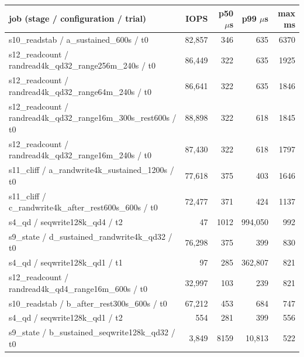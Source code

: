 \begin{tabular}{lrrrr}
\toprule
job (stage / configuration / trial) & IOPS & p50 $\mu$s & p99 $\mu$s & max ms \\
\midrule
s10\_readstab / a\_sustained\_600s / t0 & 82,857 & 346 & 635 & 6370 \\
s12\_readcount / randread4k\_qd32\_range256m\_240s / t0 & 86,449 & 322 & 635 & 1925 \\
s12\_readcount / randread4k\_qd32\_range64m\_240s / t0 & 86,641 & 322 & 635 & 1846 \\
s12\_readcount / randread4k\_qd32\_range16m\_300s\_rest600s / t0 & 88,898 & 322 & 618 & 1845 \\
s12\_readcount / randread4k\_qd32\_range16m\_240s / t0 & 87,430 & 322 & 618 & 1797 \\
s11\_cliff / a\_randwrite4k\_sustained\_1200s / t0 & 77,618 & 375 & 403 & 1646 \\
s11\_cliff / c\_randwrite4k\_after\_rest600s\_600s / t0 & 72,477 & 371 & 424 & 1137 \\
s4\_qd / seqwrite128k\_qd4 / t2 & 47 & 1012 & 994,050 & 992 \\
s9\_state / d\_sustained\_randwrite4k\_qd32 / t0 & 76,298 & 375 & 399 & 830 \\
s4\_qd / seqwrite128k\_qd1 / t1 & 97 & 285 & 362,807 & 821 \\
s12\_readcount / randread4k\_qd4\_range16m\_600s / t0 & 32,997 & 103 & 239 & 821 \\
s10\_readstab / b\_after\_rest300s\_600s / t0 & 67,212 & 453 & 684 & 747 \\
s4\_qd / seqwrite128k\_qd1 / t2 & 554 & 281 & 399 & 556 \\
s9\_state / b\_sustained\_seqwrite128k\_qd32 / t0 & 3,849 & 8159 & 10,813 & 522 \\
\bottomrule
\end{tabular}
